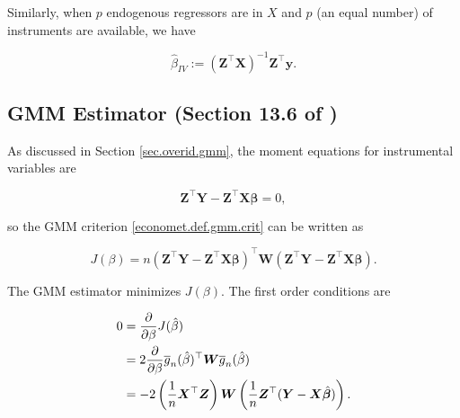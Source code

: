 %
%
%

Similarly, when \(p\) endogenous regressors are in \(X\) and \(p\) (an equal number) of instruments are available, we have

\begin{equation}\label{economet.inst.est}
\hat{\beta}_{IV} :=  \left( \boldsymbol{Z}^\top \boldsymbol{X} \right)^{-1} \boldsymbol{Z}^\top \boldsymbol{y}.
\end{equation}

\subsection{GMM Estimator (Section 13.6 of \citet{hansen2020})}

As discussed in Section \ref{sec.overid.gmm}, the moment equations for instrumental variables are 

\[
\boldsymbol{Z}^\top \boldsymbol{Y} - \boldsymbol{Z}^\top \boldsymbol{X} \boldsymbol{\beta} = 0,
\]

so the GMM criterion \eqref{economet.def.gmm.crit} can be written as

\[
J(\beta) = n \left( \boldsymbol{Z}^\top \boldsymbol{Y} - \boldsymbol{Z}^\top \boldsymbol{X} \boldsymbol{\beta}\right)^\top \boldsymbol{W} \left(\boldsymbol{Z}^\top \boldsymbol{Y} - \boldsymbol{Z}^\top \boldsymbol{X} \boldsymbol{\beta}\right).
\]

The GMM estimator minimizes \(J(\beta)\). The first order conditions are

\begin{align*}
0 & = \pderiv{}{\beta} J(\hat{\beta})
\\ & = 2 \pderiv{}{\beta} \overline{g}_n(\hat{\beta})^\top \boldsymbol{W} \overline{g}_n(\hat{\beta})
\\ & = -2 \left(\frac{1}{n} \boldsymbol{X}^\top \boldsymbol{Z} \right)\boldsymbol{W}  \left( \frac{1}{n} \boldsymbol{Z}^\top (\boldsymbol{Y} - \boldsymbol{X} \hat{\boldsymbol{\beta}} )\right).
\end{align*}

